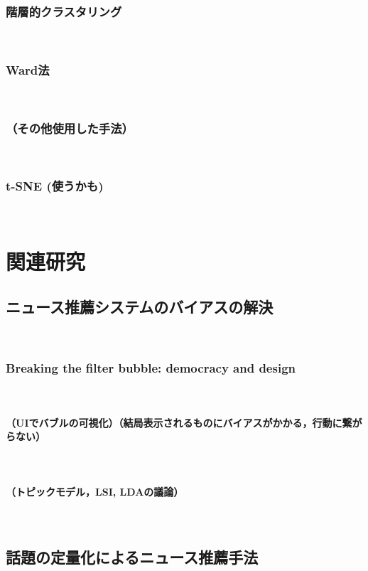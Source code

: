 \documentclass[12pt,a4j]{jreport}
\begin{document}
\subsection{階層的クラスタリング}
~

\subsection{Ward法}
~

\subsection{（その他使用した手法）}
~

\subsection{t-SNE (使うかも)}
~


\chapter{関連研究}


\section{ニュース推薦システムのバイアスの解決}
~

\subsection{Breaking the filter bubble: democracy and design}
~

\subsubsection{（UIでバブルの可視化）（結局表示されるものにバイアスがかかる，行動に繋がらない）}
~

\subsubsection{（トピックモデル，LSI, LDAの議論）}
~

\section{話題の定量化によるニュース推薦手法}
~
\end{document}

